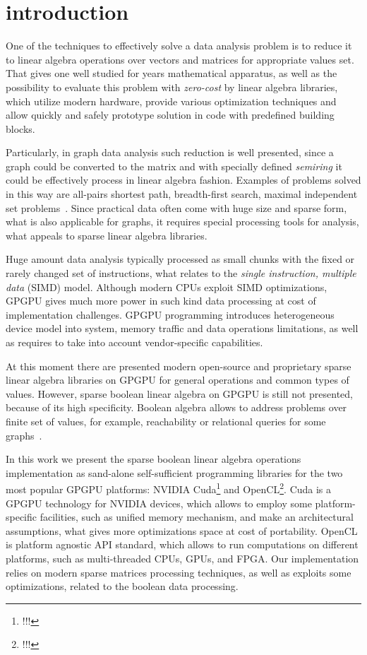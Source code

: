 \section{introduction}


One of the techniques to effectively solve a data analysis problem is to reduce it to linear
algebra operations over vectors and matrices for appropriate values set. That gives one well 
studied for years mathematical apparatus, as well as the possibility to evaluate this problem with 
\textit{zero-cost} by linear algebra libraries, which utilize modern hardware, provide various 
optimization techniques and allow quickly and safely prototype solution in code with predefined 
building blocks.

Particularly, in graph data analysis such reduction is well presented, since a graph could be 
converted to the matrix and with specially defined \textit{semiring} it could be effectively 
process in linear algebra fashion. Examples of problems solved in this way are all-pairs shortest 
path, breadth-first search, maximal independent set problems~\cite{todo}. Since practical data 
often come with huge size and sparse form, what is also applicable for graphs, it requires special 
processing tools for analysis, what appeals to sparse linear algebra libraries.

Huge amount data analysis typically processed as small chunks with the fixed or rarely changed set 
of instructions, what relates to the \textit{single instruction, multiple data} (SIMD) model. 
Although modern CPUs exploit SIMD optimizations, GPGPU gives much more power in such kind data 
processing at cost of implementation challenges. GPGPU programming introduces heterogeneous device 
model into system, memory traffic and data operations limitations, as well as requires to take into
account vendor-specific capabilities. 

At this moment there are presented modern open-source and proprietary sparse linear algebra 
libraries on GPGPU for general operations and common types of values. However, sparse boolean 
linear algebra on GPGPU is still not presented, because of its high specificity. Boolean algebra 
allows to address problems over finite set of values, for example, reachability or relational 
queries for some graphs~\cite{10.5555/972525.972527, OKHOTIN2014101, !!!}.

In this work we present the sparse boolean linear algebra operations implementation as sand-alone 
self-sufficient programming libraries for the two most popular GPGPU platforms: NVIDIA Cuda\footnote{!!!} and 
OpenCL\footnote{!!!}. Cuda is a GPGPU technology for NVIDIA devices, which allows to employ some 
platform-specific facilities, such as unified memory mechanism, and make an architectural 
assumptions, what gives more optimizations space at cost of portability. OpenCL is platform 
agnostic API standard, which allows to run computations on different platforms, such as 
multi-threaded CPUs, GPUs, and FPGA. Our implementation relies on modern sparse matrices processing
techniques, as well as exploits some optimizations, related to the boolean data processing.